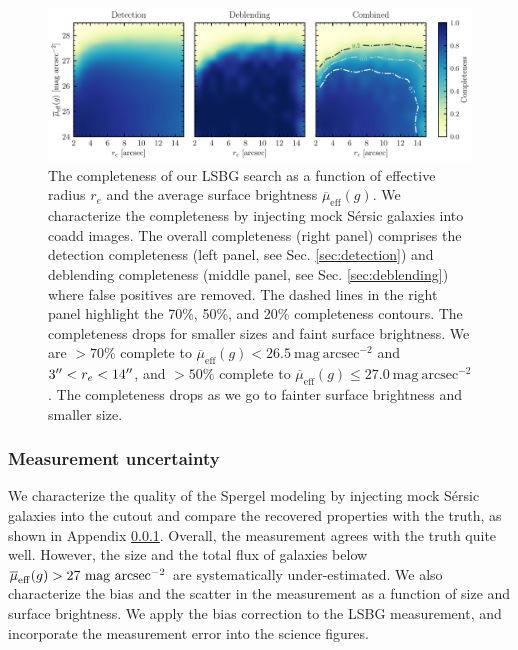 \documentclass[twocolumn,astrosymb,twocolappendix]{aastex631}
\newcommand{\sbunit}{\mathrm{mag\ arcsec}^{-2}}
\newcommand{\sbeff}{\overline{\mu}_{\mathrm{eff}}(g)}
\newcommand{\sersic}{S\'ersic}
\begin{document}
\begin{CJK*}{UTF8}{gbsn}
\begin{figure}
	\vbox{ 
		\centering
		\includegraphics[width=1\linewidth]{completeness.pdf}
	}
	\caption{The completeness of our LSBG search as a function of effective radius $r_e$ and the average surface brightness $\sbeff$. We characterize the completeness by injecting mock \sersic{} galaxies into coadd images. The overall completeness (right panel) comprises the detection completeness (left panel, see Sec. \ref{sec:detection}) and deblending completeness (middle panel, see Sec. \ref{sec:deblending}) where false positives are removed. The dashed lines in the right panel highlight the 70\%, 50\%, and 20\% completeness contours. The completeness drops for smaller sizes and faint surface brightness. We are $>70\%$ complete to $\sbeff < 26.5\ \sbunit$ and $3\mbox{$^{\prime\prime}$} < r_e < 14\mbox{$^{\prime\prime}$}$, and $>50\%$ complete to $\sbeff \leqslant 27.0\ \sbunit$. The completeness drops as we go to fainter surface brightness and smaller size. 
	}
	\label{fig:completeness}
\end{figure}

\subsubsection{Measurement uncertainty}\label{sec:meas_unc}


We characterize the quality of the Spergel modeling by injecting mock \sersic{} galaxies into the cutout and compare the recovered properties with the truth, as shown in Appendix \ref{sec:meas_unc}. Overall, the measurement agrees with the truth quite well. However, the size and the total flux of galaxies below $\overline{\mu}_{\rm eff} (g) > 27\ \sbunit$ are systematically under-estimated. We also characterize the bias and the scatter in the measurement as a function of size and surface brightness. We apply the bias correction to the LSBG measurement, and incorporate the measurement error into the science figures. 


\end{CJK*}
\end{document}
